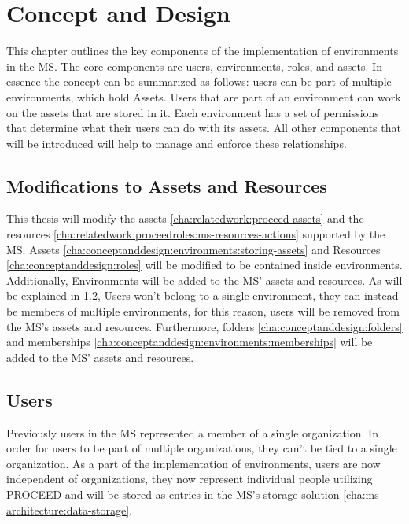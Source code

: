 \chapter{Concept and Design}
\label{cha:conceptanddesign}

This chapter outlines the key components of the implementation of environments in the MS.
The core components are users, environments, roles, and assets.
In essence the concept can be summarized as follows: users can be part of multiple
environments, which hold Assets.
Users that are part of an environment can work on the assets that are stored in it.
Each environment has a set of permissions that determine what their users can do with its
assets.
All other components that will be introduced will help to manage and enforce these relationships.

\section{Modifications to Assets and Resources}

This thesis will modify the assets \ref{cha:relatedwork:proceed-assets} and the resources
\ref{cha:relatedwork:proceedroles:ms-resources-actions} supported by the MS.
Assets \ref{cha:conceptanddesign:environments:storing-assets} and
Resources \ref{cha:conceptanddesign:roles} will be modified to be contained inside environments.
Additionally, Environments will be added to the MS' assets and resources.
As will be explained in \ref{cha:conceptanddesign:users}, Users won't belong to a single
environment, they can instead be members of multiple environments, for this reason,
users will be removed from the MS's assets and resources.
Furthermore, folders \ref{cha:conceptanddesign:folders} and  memberships
\ref{cha:conceptanddesign:environments:memberships} will be added to the MS' assets and
resources.

\section{Users}
\label{cha:conceptanddesign:users}

Previously users in the MS represented a member of a single organization.
In order for users to be part of multiple organizations, they can't be tied to a single
organization.
As a part of the implementation of environments, users are now independent of
organizations,
they now represent individual people utilizing PROCEED and will be stored as entries in
the MS's storage solution \ref{cha:ms-architecture:data-storage}.

